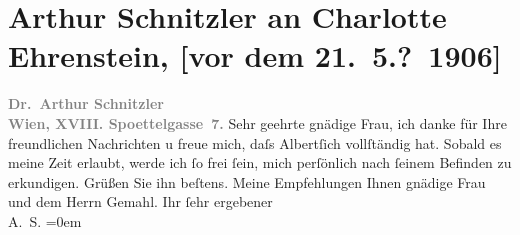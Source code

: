 

         
         \renewcommand{\erwaehntePersonen}{Personen: Charlotte Ehrenstein, Albert Ehrenstein, Alexander Ehrenstein}
         \renewcommand{\erwaehnteOrte}{Orte: Edmund-Weiß-Gasse 7, Wien}
         \renewcommand{\erwaehnteWerke}{}
               \section[Arthur Schnitzler an Charlotte Ehrenstein, {[}vor dem 21. 5.? 1906{]}]{ Arthur Schnitzler an Charlotte Ehrenstein, {[}vor dem
               21. 5.? 1906{]}}\nopagebreak{}\rehead{ }\begin{ledgroupsized}[t]{13cm}\normalsize\beginnumbering{} \toendnotes[C]{\smallbreak\pagebreak[2]} 
\toendnotes[C]{\smallbreak}\pstart
           \noindent{}{\pb}\textcolor{gray}{\textbf{Dr. Arthur Schnitzler}}{\\}\textcolor{gray}{\textbf{Wien, XVIII. Spoettelgasse 7.}}\pend
           \pstart
           Sehr geehrte gnädige Frau, ich danke für Ihre freundlichen
               Nachrichten u freue mich, daſs Albertſich vollſtändig \label{K_L01598-1v}\label{K_L01598-1h} hat. Sobald es meine Zeit erlaubt, werde ich ſo frei ſein, mich
               perſönlich nach ſeinem {\pb}Befinden zu erkundigen.\pend
           \pstart
           Grüßen Sie ihn beſtens. Meine Empfehlungen Ihnen gnädige Frau und dem Herrn Gemahl.\pend
           \pstart
           Ihr ſehr ergebener{\\[\baselineskip]}\spacefill\mbox{A. S.}\pend
           \leftskip=0em{}
         
         \endnumbering{}\end{ledgroupsized}  \newcommand{\dateiname}{L01598}\newcommand{\titel}{Arthur Schnitzler an Charlotte Ehrenstein, [vor dem 21. 5.? 1906]}\newcommand{\editorInnen}{Martin Anton Müller und Gerd-Hermann Susen}
      
